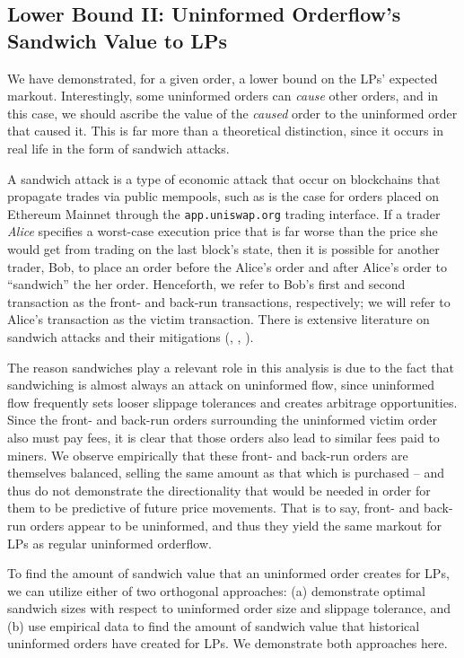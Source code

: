 \subsection{Lower Bound II: Uninformed Orderflow's Sandwich Value to LPs} \label{subsection:sandwich-value-to-lps}
    We have demonstrated, for a given order, a lower bound on the LPs' expected markout. Interestingly, some uninformed orders can \textit{cause} other orders, and in this case, we should ascribe the value of the \textit{caused} order to the uninformed order that caused it. This is far more than a theoretical distinction, since it occurs in real life in the form of sandwich attacks.

    A sandwich attack is a type of economic attack that occur on blockchains that propagate trades via public mempools, such as is the case for orders placed on Ethereum Mainnet through the \texttt{app.uniswap.org} trading interface. If a trader \textit{Alice} specifies a worst-case execution price that is far worse than the price she would get from trading on the last block's state, then it is possible for another trader, Bob, to place an order before the Alice's order and after Alice's order  to ``sandwich'' the her order. Henceforth, we refer to Bob's first and second transaction as the front- and back-run transactions, respectively; we will refer to Alice's transaction as the victim transaction. There is extensive literature on sandwich attacks and their mitigations (\cite{kulkarni2022towards}, \cite{zust2021analyzing}, \cite{zhou2021high}).
    
    The reason sandwiches play a relevant role in this analysis is 
    due to the fact that sandwiching is almost always an attack on uninformed flow, since uninformed flow frequently sets looser slippage tolerances and creates arbitrage opportunities. 
    Since the front- and back-run orders surrounding the uninformed victim order also must pay fees, it is clear that those orders also lead to similar fees paid to miners. We observe empirically that these front- and back-run orders are themselves balanced, selling the same amount as that which is purchased -- and thus do not demonstrate the directionality that would be needed in order for them to be predictive of future price movements. That is to say, front- and back-run orders appear to be uninformed, and thus they yield the same markout for LPs as regular uninformed orderflow.

    To find the amount of sandwich value that an uninformed order creates for LPs, we can utilize either of two orthogonal approaches: (a) demonstrate optimal sandwich sizes with respect to uninformed order size and slippage tolerance, and (b) use empirical data to find the amount of sandwich value that historical uninformed orders have created for LPs. We demonstrate both approaches here.

